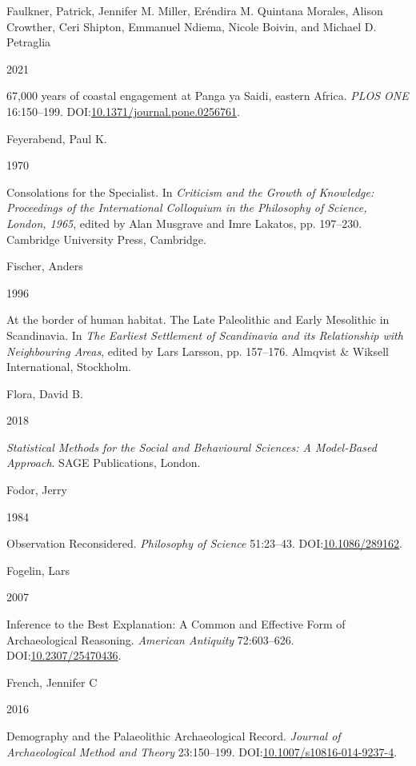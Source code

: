 \documentclass[
  a4paper,
  oneside]{uiophdthesis}
\newlength{\cslhangindent}
\newlength{\csllabelwidth}
\newlength{\cslentryspacingunit} %
\newenvironment{CSLReferences}[2] %
 {%
  \setlength{\parindent}{0pt}
  \ifodd #1
  \let\oldpar\par
  \def\par{\hangindent=\cslhangindent\oldpar}
  \fi
  \setlength{\parskip}{#2\cslentryspacingunit}
 }%
 {}
\newcommand{\CSLBlock}[1]{#1\hfill\break}
\newcommand{\CSLLeftMargin}[1]{\parbox[t]{\csllabelwidth}{#1}}
\newcommand{\CSLRightInline}[1]{\parbox[t]{\linewidth - \csllabelwidth}{#1}\break}
\begin{document}
\begin{CSLReferences}{0}{0}
\leavevmode{}%
\CSLBlock{Faulkner, Patrick, Jennifer M. Miller, Eréndira M. Quintana Morales, Alison Crowther, Ceri Shipton, Emmanuel Ndiema, Nicole Boivin, and Michael D. Petraglia}
\CSLLeftMargin{ 2021}
\CSLRightInline{67,000 years of coastal engagement at Panga ya Saidi, eastern Africa. \emph{PLOS ONE} 16:150--199. DOI:\href{https://doi.org/10.1371/journal.pone.0256761}{10.1371/journal.pone.0256761}.}

\leavevmode{}%
\CSLBlock{Feyerabend, Paul K.}
\CSLLeftMargin{ 1970}
\CSLRightInline{{Consolations for the Specialist}. In \emph{{Criticism and the Growth of Knowledge: Proceedings of the International Colloquium in the Philosophy of Science, London, 1965}}, edited by Alan Musgrave and Imre Lakatos, pp. 197--230. Cambridge University Press, Cambridge.}

\leavevmode{}%
\CSLBlock{Fischer, Anders}
\CSLLeftMargin{ 1996}
\CSLRightInline{{At the border of human habitat. The Late Paleolithic and Early Mesolithic in Scandinavia}. In \emph{{The Earliest Settlement of Scandinavia and its Relationship with Neighbouring Areas}}, edited by Lars Larsson, pp. 157--176. Almqvist \& Wiksell International, Stockholm.}

\leavevmode{}%
\CSLBlock{Flora, David B.}
\CSLLeftMargin{ 2018}
\CSLRightInline{\emph{{Statistical Methods for the Social and Behavioural Sciences: A Model-Based Approach}}. SAGE Publications, London.}

\leavevmode{}%
\CSLBlock{Fodor, Jerry}
\CSLLeftMargin{ 1984}
\CSLRightInline{Observation Reconsidered. \emph{Philosophy of Science} 51:23--43. DOI:\href{https://doi.org/10.1086/289162}{10.1086/289162}.}

\leavevmode{}%
\CSLBlock{Fogelin, Lars}
\CSLLeftMargin{ 2007}
\CSLRightInline{Inference to the Best Explanation: A Common and Effective Form of Archaeological Reasoning. \emph{American Antiquity} 72:603--626. DOI:\href{https://doi.org/10.2307/25470436}{10.2307/25470436}.}

\leavevmode{}%
\CSLBlock{French, Jennifer C}
\CSLLeftMargin{ 2016}
\CSLRightInline{Demography and the Palaeolithic Archaeological Record. \emph{Journal of Archaeological Method and Theory} 23:150--199. DOI:\href{https://doi.org/10.1007/s10816-014-9237-4}{10.1007/s10816-014-9237-4}.}


\end{CSLReferences}
\end{document}
